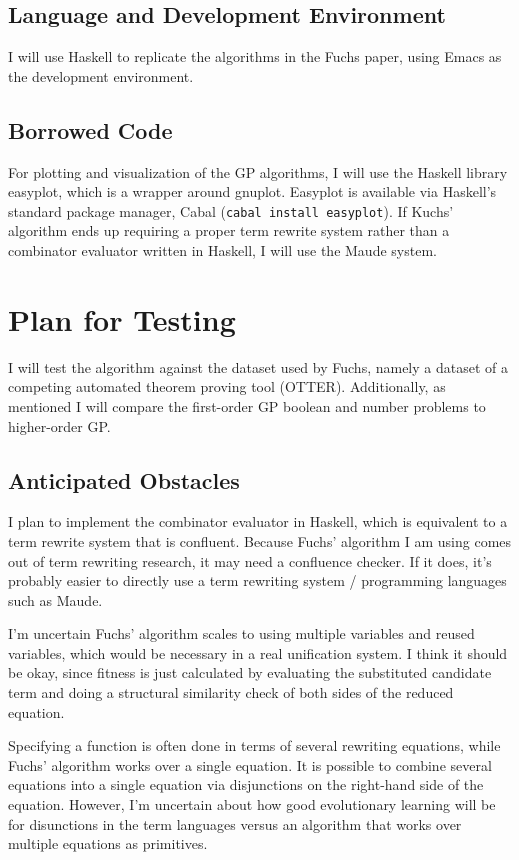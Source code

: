 \documentclass{article}
\begin{document}
\subsection{Language and Development Environment}

I will use Haskell to replicate the algorithms in the Fuchs paper,
using Emacs as the development environment. 

\subsection{Borrowed Code}

For plotting and visualization of the GP algorithms, I will use the
Haskell library easyplot, which is a wrapper around gnuplot. Easyplot
is available via Haskell's standard package manager, Cabal
(\texttt{cabal install easyplot}).
If Kuchs' algorithm ends up requiring a proper term rewrite system
rather than a combinator evaluator written in Haskell, I will use the
Maude system.

\section{Plan for Testing}

I will test the algorithm against the dataset used by Fuchs, namely a
dataset of a competing automated theorem proving tool (OTTER).
Additionally, as mentioned I will compare the first-order GP boolean
and number problems to higher-order GP.

\subsection{Anticipated Obstacles}

I plan to implement the combinator evaluator in Haskell, which is
equivalent to a term rewrite system that is confluent. Because Fuchs'
algorithm I am using comes out of term rewriting research, it may need
a confluence checker. If it does, it's probably easier to directly use
a term rewriting system / programming languages such as Maude.

I'm uncertain Fuchs' algorithm scales to using
multiple variables and reused variables, which would be necessary in a
real unification system. I think it should be okay, since fitness is
just calculated by evaluating the substituted candidate term and doing
a structural similarity check of both sides of the reduced equation.

Specifying a function is often done in terms of several rewriting
equations, while Fuchs' algorithm works over a single equation. It is
possible to combine several equations into a single equation via
disjunctions on the right-hand side of the equation. However, I'm
uncertain about how good evolutionary learning will be for disunctions
in the term languages versus an algorithm that works over multiple
equations as primitives.
\end{document}

